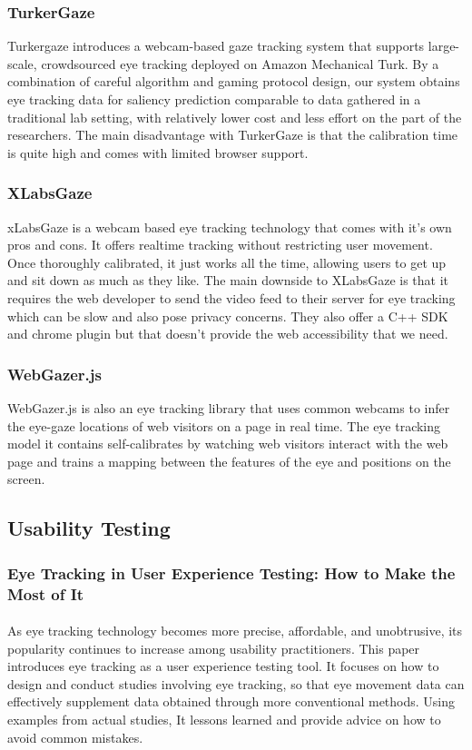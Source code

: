 \documentclass[a4paper,12pt,oneside]{article}
\begin{document}
       \subsubsection{TurkerGaze}
       Turkergaze introduces a webcam-based gaze tracking system that supports large-scale, crowdsourced eye tracking deployed on Amazon Mechanical Turk. By a combination of careful algorithm and gaming protocol design, our system obtains eye tracking data for saliency prediction comparable to data gathered in a traditional lab setting, with relatively lower cost and less effort on the part of the researchers.
       The main disadvantage with TurkerGaze is that the calibration time is quite high and comes with limited browser support.
      

\subsubsection{XLabsGaze}
xLabsGaze is a webcam based eye tracking technology that comes with it's own pros and cons. It offers realtime tracking without restricting user movement. Once thoroughly calibrated, it just works all the time, allowing users to get up and sit down as much as they like. The main downside to XLabsGaze is that it requires the web developer to send the video feed to their server for eye tracking which can be slow and also pose privacy concerns. They also offer a C++ SDK and chrome plugin but that doesn't provide the web accessibility that we need.

\subsubsection{WebGazer.js}
     WebGazer.js is also an eye tracking library that uses common webcams to infer the eye-gaze locations of web visitors on a page in real time. The eye tracking model it contains self-calibrates by watching web visitors interact with the web page and trains a mapping between the features of the eye and positions on the screen.



\subsection{Usability Testing}
\subsubsection{Eye Tracking in User Experience Testing: How to Make the Most of It}
\paragraph{}
As eye tracking technology becomes more precise, affordable, and unobtrusive, its popularity continues to increase among usability practitioners. This paper introduces eye tracking as a user experience testing tool. It focuses on how to design and conduct studies involving eye tracking, so that eye movement data can effectively supplement data obtained through more conventional methods. Using examples from actual studies, It lessons learned and provide advice on how to avoid common mistakes.
\end{document}
